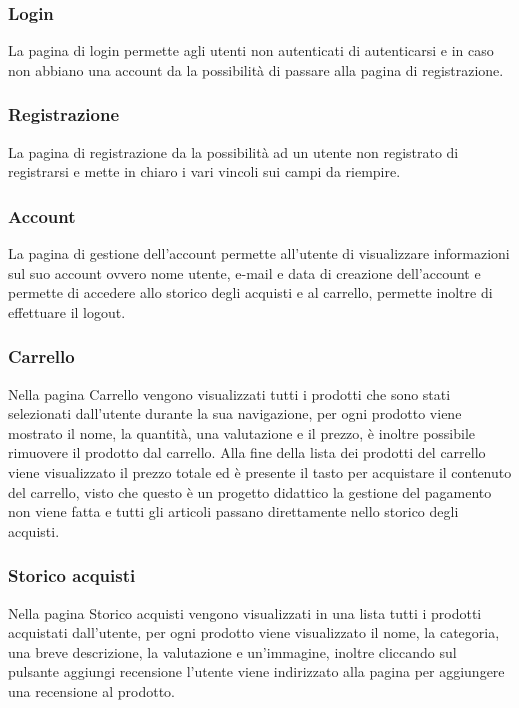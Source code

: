 \subsubsection{Login}
La pagina di login permette agli utenti non autenticati di autenticarsi e in caso non abbiano una account da la possibilità di passare alla pagina di registrazione.

\subsubsection{Registrazione}
La pagina di registrazione da la possibilità ad un utente non registrato di registrarsi e mette in chiaro i vari vincoli sui campi da riempire.

\subsubsection{Account}
La pagina di gestione dell'account permette all'utente di visualizzare informazioni sul suo account ovvero nome utente, e-mail e data di creazione dell'account e permette di accedere allo storico degli acquisti e al carrello, permette inoltre di effettuare il logout.

\subsubsection{Carrello}
Nella pagina Carrello vengono visualizzati tutti i prodotti che sono stati selezionati dall'utente durante la sua navigazione, per ogni prodotto viene mostrato il nome, la quantità, una valutazione e il prezzo, è inoltre possibile rimuovere il prodotto dal carrello.\newline
Alla fine della lista dei prodotti del carrello viene visualizzato il prezzo totale ed è presente il tasto per acquistare il contenuto del carrello, visto che questo è un progetto didattico la gestione del pagamento non viene fatta e tutti gli articoli passano direttamente nello storico degli acquisti.

\subsubsection{Storico acquisti}
Nella pagina Storico acquisti vengono visualizzati in una lista tutti i prodotti acquistati dall'utente, per ogni prodotto viene visualizzato il nome, la categoria, una breve descrizione, la valutazione e un'immagine, inoltre cliccando sul pulsante aggiungi recensione l'utente viene indirizzato alla pagina per aggiungere una recensione al prodotto.

